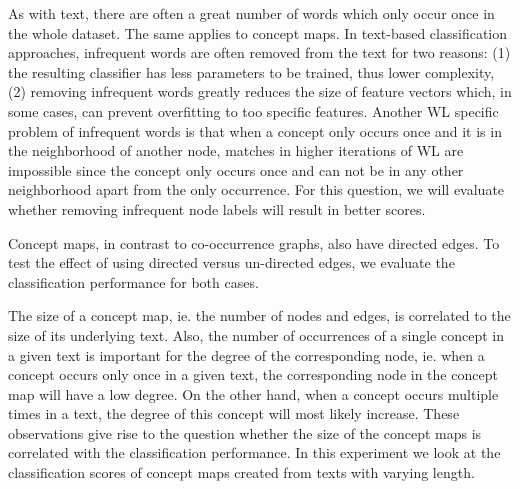 As with text, there are often a great number of words which only occur once in the whole dataset.
The same applies to concept maps.
In text-based classification approaches, infrequent words are often removed from the text for two reasons: (1) the resulting classifier has less parameters to be trained, thus lower complexity, (2) removing infrequent words greatly reduces the size of feature vectors which, in some cases, can prevent overfitting to too specific features.
Another WL specific problem of infrequent words is that when a concept only occurs once and it is in the neighborhood of another node, matches in higher iterations of WL are impossible since the concept only occurs once and can not be in any other neighborhood apart from the only occurrence.
For this question, we will evaluate whether removing infrequent node labels will result in better scores.

Concept maps, in contrast to co-occurrence graphs, also have directed edges.
To test the effect of using directed versus un-directed edges, we evaluate the classification performance for both cases.

The size of a concept map, ie. the number of nodes and edges, is correlated to the size of its underlying text.
Also, the number of occurrences of a single concept in a given text is important for the degree of the corresponding node, ie. when a concept occurs only once in a given text, the corresponding node in the concept map will have a low degree.
On the other hand, when a concept occurs multiple times in a text, the degree of this concept will most likely increase.
These observations give rise to the question whether the size of the concept maps is correlated with the classification performance.
In this experiment we look at the classification scores of concept maps created from texts with varying length.


